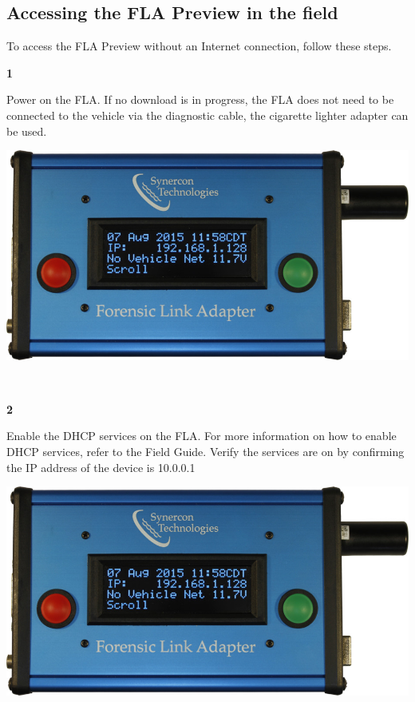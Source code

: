 \documentclass[11pt]{article}
\begin{document}
\subsection{Accessing the FLA Preview in the field}
To access the FLA Preview without an Internet connection, follow these steps.\\[\baselineskip]
\noindent\begin{minipage}{0.3\textwidth}%
\begin{center}
\textbf{1}\\[\baselineskip]
\end{center}
Power on the FLA. If no download is in progress, the FLA does not need to be connected to the vehicle via the diagnostic cable, the cigarette lighter adapter can be used.
\end{minipage}%
\hfill%
\begin{minipage}{0.6\textwidth}
\includegraphics[width=\linewidth]{../media/fla_screens/ethernet_and_others/main/title_no_net}
\end{minipage}\\[\baselineskip]
\noindent\begin{minipage}{0.3\textwidth}%
\begin{center}
\textbf{2}\\[\baselineskip]
\end{center}
Enable the DHCP services on the FLA. For more information on how to enable DHCP services, refer to the Field Guide. Verify the services are on by confirming the IP address of the device is 10.0.0.1
\end{minipage}%
\hfill%
\begin{minipage}{0.6\textwidth}
\includegraphics[width=\linewidth]{../media/fla_screens/ethernet_and_others/main/title_no_net}
\end{minipage}\\[\baselineskip]
\end{document}
